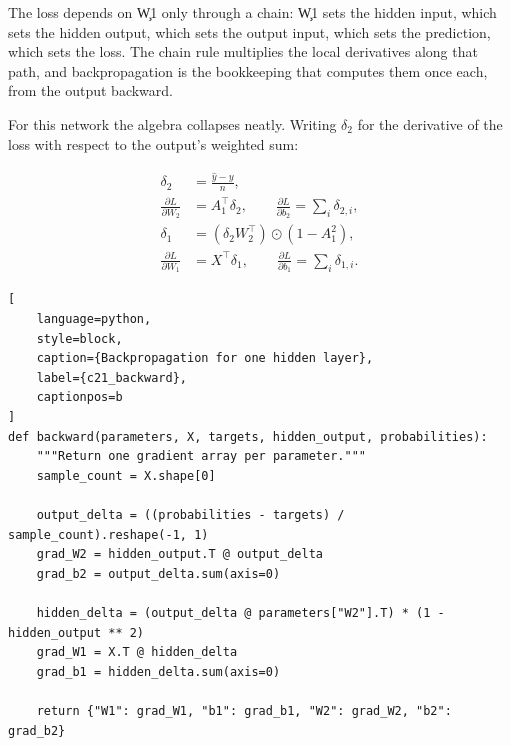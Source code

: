 
The loss depends on \c{W1} only through a chain: \c{W1} sets the hidden input,
which sets the hidden output, which sets the output input, which sets the
prediction, which sets the loss. The chain rule multiplies the local derivatives
along that path, and backpropagation is the bookkeeping that computes them once
each, from the output backward.

For this network the algebra collapses neatly. Writing $\delta_2$ for the
derivative of the loss with respect to the output's weighted sum:

\begin{align*}
\delta_2 &= \frac{\hat{y} - y}{n}, \\
\frac{\partial L}{\partial W_2} &= A_1^{\top}\delta_2, \qquad
\frac{\partial L}{\partial b_2} = \sum_i \delta_{2,i}, \\
\delta_1 &= \left(\delta_2 W_2^{\top}\right) \odot \left(1 - A_1^{2}\right), \\
\frac{\partial L}{\partial W_1} &= X^{\top}\delta_1, \qquad
\frac{\partial L}{\partial b_1} = \sum_i \delta_{1,i}.
\end{align*}

\begin{lstlisting}[
    language=python,
    style=block,
    caption={Backpropagation for one hidden layer},
    label={c21_backward},
    captionpos=b
]
def backward(parameters, X, targets, hidden_output, probabilities):
    """Return one gradient array per parameter."""
    sample_count = X.shape[0]

    output_delta = ((probabilities - targets) / sample_count).reshape(-1, 1)
    grad_W2 = hidden_output.T @ output_delta
    grad_b2 = output_delta.sum(axis=0)

    hidden_delta = (output_delta @ parameters["W2"].T) * (1 - hidden_output ** 2)
    grad_W1 = X.T @ hidden_delta
    grad_b1 = hidden_delta.sum(axis=0)

    return {"W1": grad_W1, "b1": grad_b1, "W2": grad_W2, "b2": grad_b2}
\end{lstlisting}

